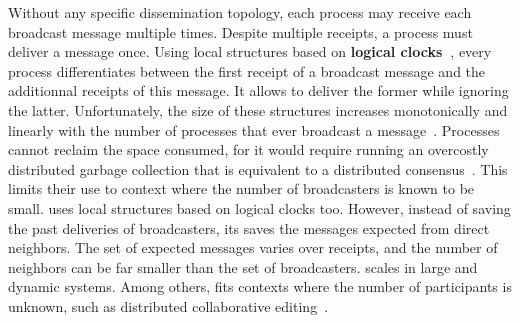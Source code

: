 Without any specific dissemination topology, each process may receive each
broadcast message multiple times. Despite multiple receipts, a process must
deliver a message once.
Using local structures based on \textbf{logical clocks~\cite{lamport1978time}},
every process differentiates between the first receipt of a broadcast message
and the additionnal receipts of this message. It allows to deliver the former
while ignoring the latter. Unfortunately, the size of these structures increases
monotonically and linearly with the number of processes that ever broadcast a
message~\cite{malkhi2007concise,mukund2014optimized}.  Processes cannot reclaim
the space consumed, for it would require running an overcostly distributed
garbage collection that is equivalent to a distributed
consensus~\cite{abdullahi1998garbage}.  This limits their use to context where
the number of broadcasters is known to be small.  \RPCBROADCAST uses local
structures based on logical clocks too. However, instead of saving the past
deliveries of broadcasters, its saves the messages expected from direct
neighbors. The set of expected messages varies over receipts, and the number of
neighbors can be far smaller than the set of broadcasters. \RPCBROADCAST scales
in large and dynamic systems. Among others, \RPCBROADCAST fits contexts where
the number of participants is unknown, such as distributed collaborative
editing~\cite{nedelec2016crate}.


